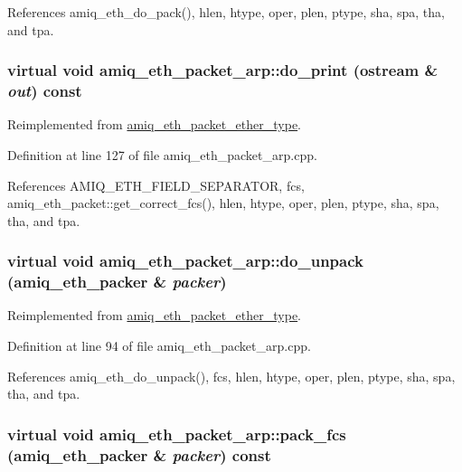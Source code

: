 References amiq\_\-eth\_\-do\_\-pack(), hlen, htype, oper, plen, ptype, sha, spa, tha, and tpa.\hypertarget{classamiq__eth__packet__arp_abbb862d7b7abe9b1c6d49455f80f6921}{
\subsubsection[{do\_\-print}]{\setlength{\rightskip}{0pt plus 5cm}virtual void amiq\_\-eth\_\-packet\_\-arp::do\_\-print (ostream \& {\em out}) const}}
\label{classamiq__eth__packet__arp_abbb862d7b7abe9b1c6d49455f80f6921}


Reimplemented from \hyperlink{classamiq__eth__packet__ether__type_a9b2852fa1aaf278138fde2232e446f63}{amiq\_\-eth\_\-packet\_\-ether\_\-type}.

Definition at line 127 of file amiq\_\-eth\_\-packet\_\-arp.cpp.

References AMIQ\_\-ETH\_\-FIELD\_\-SEPARATOR, fcs, amiq\_\-eth\_\-packet::get\_\-correct\_\-fcs(), hlen, htype, oper, plen, ptype, sha, spa, tha, and tpa.\hypertarget{classamiq__eth__packet__arp_afa8463360e8e62b24e1171093b00a798}{
\subsubsection[{do\_\-unpack}]{\setlength{\rightskip}{0pt plus 5cm}virtual void amiq\_\-eth\_\-packet\_\-arp::do\_\-unpack ({\bf amiq\_\-eth\_\-packer} \& {\em packer})}}
\label{classamiq__eth__packet__arp_afa8463360e8e62b24e1171093b00a798}


Reimplemented from \hyperlink{classamiq__eth__packet__ether__type_a0c86ef80c46bbed384739b23e5efb0ef}{amiq\_\-eth\_\-packet\_\-ether\_\-type}.

Definition at line 94 of file amiq\_\-eth\_\-packet\_\-arp.cpp.

References amiq\_\-eth\_\-do\_\-unpack(), fcs, hlen, htype, oper, plen, ptype, sha, spa, tha, and tpa.\hypertarget{classamiq__eth__packet__arp_acfbc5406f0f914c2cae4a69c3aac1efd}{
\subsubsection[{pack\_\-fcs}]{\setlength{\rightskip}{0pt plus 5cm}virtual void amiq\_\-eth\_\-packet\_\-arp::pack\_\-fcs ({\bf amiq\_\-eth\_\-packer} \& {\em packer}) const}}
\label{classamiq__eth__packet__arp_acfbc5406f0f914c2cae4a69c3aac1efd}


